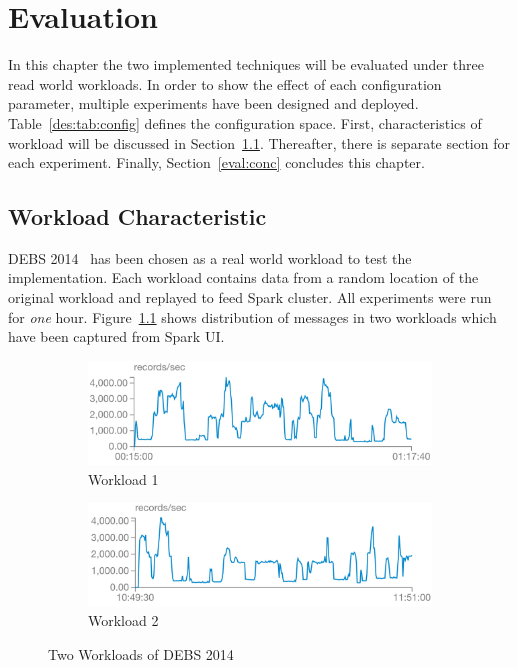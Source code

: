\chapter{Evaluation}
\label{eval}
In this chapter the two implemented techniques will be evaluated under three read world workloads. In order to show the effect of each configuration parameter, multiple experiments have been designed and deployed. Table~\ref{des:tab:config} defines the configuration space. First, characteristics of workload will be discussed in Section~\ref{eval:workload}. Thereafter, there is separate section for each experiment. Finally, Section~\ref{eval:conc} concludes this chapter.

\section{Workload Characteristic}
\label{eval:workload}

DEBS 2014~\cite{debs2014} has been chosen as a real world workload to test the implementation. Each workload contains data from a random location of the original workload and replayed to feed Spark cluster. All experiments were run for \emph{one} hour. Figure~\ref{eval:fig:workload} shows distribution of messages in two workloads which have been captured from Spark UI.
\begin{figure}[!htbp]
    \centering
      \begin{subfigure}[h]{\linewidth}
        \centering\includegraphics[scale=0.6]{workload1.png}
        \caption{Workload 1}
    \end{subfigure}
    \begin{subfigure}[h]{\linewidth}
        \centering\includegraphics[scale=0.6]{workload2.png}
        \caption{Workload 2}
    \end{subfigure}
    \caption{Two Workloads of DEBS 2014}
    \label{eval:fig:workload}
\end{figure}

